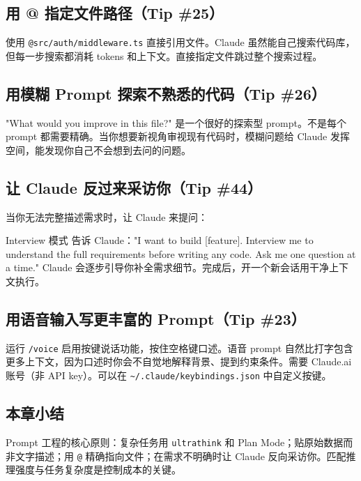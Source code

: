 \subsection{用 @ 指定文件路径（Tip \#25）}

使用 \texttt{@src/auth/middleware.ts} 直接引用文件。Claude 虽然能自己搜索代码库，但每一步搜索都消耗 tokens 和上下文。直接指定文件跳过整个搜索过程。

\subsection{用模糊 Prompt 探索不熟悉的代码（Tip \#26）}

"What would you improve in this file?" 是一个很好的探索型 prompt。不是每个 prompt 都需要精确。当你想要新视角审视现有代码时，模糊问题给 Claude 发挥空间，能发现你自己不会想到去问的问题。

\subsection{让 Claude 反过来采访你（Tip \#44）}

当你无法完整描述需求时，让 Claude 来提问：

\begin{importantbox}{Interview 模式}
告诉 Claude："I want to build [feature]. Interview me to understand the full requirements before writing any code. Ask me one question at a time." Claude 会逐步引导你补全需求细节。完成后，开一个新会话用干净上下文执行。
\end{importantbox}

\subsection{用语音输入写更丰富的 Prompt（Tip \#23）}

运行 \texttt{/voice} 启用按键说话功能，按住空格键口述。语音 prompt 自然比打字包含更多上下文，因为口述时你会不自觉地解释背景、提到约束条件。需要 Claude.ai 账号（非 API key）。可以在 \texttt{\textasciitilde/.claude/keybindings.json} 中自定义按键。

\subsection{本章小结}

Prompt 工程的核心原则：复杂任务用 \texttt{ultrathink} 和 Plan Mode；贴原始数据而非文字描述；用 \texttt{@} 精确指向文件；在需求不明确时让 Claude 反向采访你。匹配推理强度与任务复杂度是控制成本的关键。

